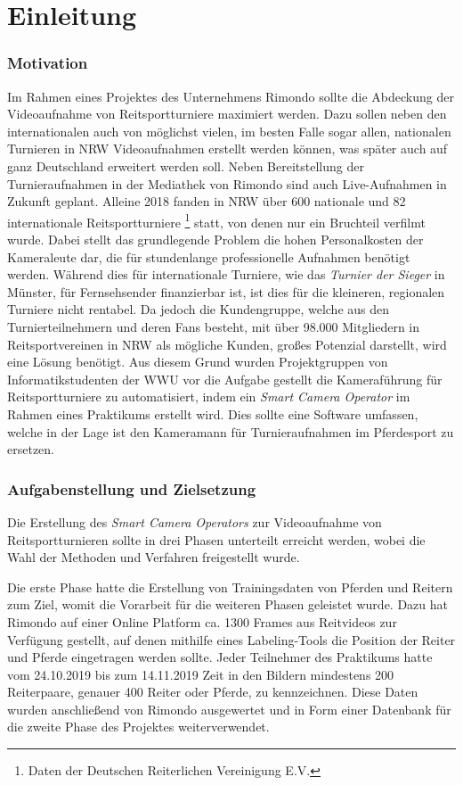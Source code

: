 \chapter{Einleitung}


\subsection*{Motivation}

Im Rahmen eines Projektes des Unternehmens Rimondo sollte die Abdeckung der Videoaufnahme von Reitsportturniere maximiert werden. Dazu sollen neben den internationalen auch von möglichst vielen, im besten Falle sogar allen, nationalen Turnieren in NRW Videoaufnahmen erstellt werden können, was später auch auf ganz Deutschland erweitert werden soll. Neben Bereitstellung der Turnieraufnahmen in der Mediathek von Rimondo sind auch Live-Aufnahmen in Zukunft geplant. Alleine 2018 fanden in NRW über 600 nationale und 82 internationale Reitsportturniere \footnote{Daten der Deutschen Reiterlichen Vereinigung E.V.} statt, von denen nur ein Bruchteil verfilmt wurde.
Dabei stellt das grundlegende Problem die hohen Personalkosten der Kameraleute dar, die für stundenlange professionelle Aufnahmen benötigt werden. Während dies für internationale Turniere, wie das \emph{Turnier der Sieger} in Münster, für Fernsehsender finanzierbar ist, ist dies für die kleineren, regionalen Turniere nicht rentabel. Da jedoch die Kundengruppe, welche aus den Turnierteilnehmern und deren Fans besteht, mit über 98.000 Mitgliedern in Reitsportvereinen in NRW als mögliche Kunden, großes Potenzial darstellt, wird eine Lösung benötigt. Aus diesem Grund wurden Projektgruppen von Informatikstudenten der WWU vor die Aufgabe gestellt die Kameraführung für Reitsportturniere zu automatisiert, indem ein \emph{Smart Camera Operator} im Rahmen eines Praktikums erstellt wird. Dies sollte eine Software umfassen, welche in der Lage ist den Kameramann für Turnieraufnahmen im Pferdesport zu ersetzen.



\subsection*{Aufgabenstellung und Zielsetzung}

Die Erstellung des \emph{Smart Camera Operators} zur Videoaufnahme von Reitsportturnieren sollte in drei Phasen unterteilt erreicht werden, wobei die Wahl der Methoden und Verfahren freigestellt wurde.

Die erste Phase hatte die Erstellung von Trainingsdaten von Pferden und Reitern zum Ziel, womit die Vorarbeit für die weiteren Phasen geleistet wurde. Dazu hat Rimondo auf einer Online Platform ca. 1300 Frames aus Reitvideos zur Verfügung gestellt, auf denen mithilfe eines Labeling-Tools die Position der Reiter und Pferde eingetragen werden sollte. Jeder Teilnehmer des Praktikums hatte vom 24.10.2019 bis zum 14.11.2019 Zeit in den Bildern mindestens 200 Reiterpaare, genauer 400 Reiter oder Pferde, zu kennzeichnen. Diese Daten wurden anschließend von Rimondo ausgewertet und in Form einer Datenbank für die zweite Phase des Projektes weiterverwendet. 

